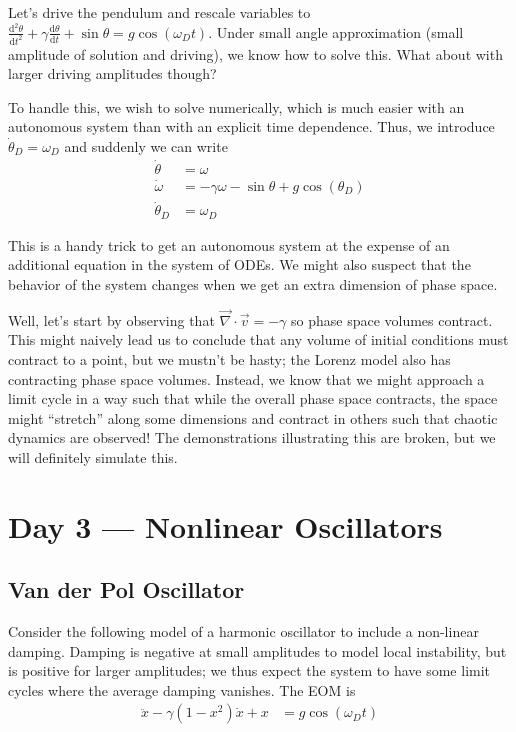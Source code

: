 \documentclass[10pt]{article}
\newcommand{\rd}[2]{\frac{\mathrm{d}#1}{\mathrm{d}#2}}
\newcommand{\rtd}[2]{\frac{\mathrm{d}^2#1}{\mathrm{d}#2^2}}
\begin{document}
Let's drive the pendulum and rescale variables to $\rtd{\theta}{t} + \gamma
\rd{\theta}{t} + \sin\theta = g\cos(\omega_D t)$. Under small angle
approximation (small amplitude of solution and driving), we know how to solve
this. What about with larger driving amplitudes though?

To handle this, we wish to solve numerically, which is much easier with an
autonomous system than with an explicit time dependence. Thus, we introduce
$\dot{\theta}_D = \omega_D$ and suddenly we can write
\begin{align}
    \dot{\theta} &= \omega \nonumber\\
    \dot{\omega} &= -\gamma \omega - \sin\theta + g\cos(\theta_D) \nonumber\\
    \dot{\theta}_D &= \omega_D
\end{align}

This is a handy trick to get an autonomous system at the expense of an
additional equation in the system of ODEs. We might also suspect that the
behavior of the system changes when we get an extra dimension of phase space.

Well, let's start by observing that $\vec{\nabla} \cdot \vec{v} = -\gamma$ so
phase space volumes contract. This might naively lead us to conclude that any
volume of initial conditions must contract to a point, but we mustn't be hasty;
the Lorenz model also has contracting phase space volumes. Instead, we know
that we might approach a limit cycle in a way such that while the overall phase
space contracts, the space might ``stretch'' along some dimensions and contract
in others such that chaotic dynamics are observed! The demonstrations
illustrating this are broken, but we will definitely simulate this.

\section{Day 3 --- Nonlinear Oscillators}

\subsection{Van der Pol Oscillator}

Consider the following model of a harmonic oscillator to include a non-linear
damping. Damping is negative at small amplitudes to model local instability,
but is positive for larger amplitudes; we thus expect the system to have some
limit cycles where the average damping vanishes. The EOM is
\begin{align}
    \ddot{x} - \gamma(1-x^2)\dot{x} + x &= g\cos(\omega_D t)
\end{align}
\end{document}
